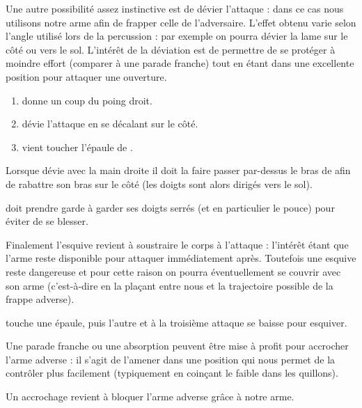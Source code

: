 Une autre possibilité assez instinctive est de dévier l'attaque : dans ce cas nous utilisons notre arme afin de frapper celle de l'adversaire.
L'effet obtenu varie selon l'angle utilisé lors de la percussion : par exemple on pourra dévier la lame sur le côté ou vers le sol.
L'intérêt de la déviation est de permettre de se protéger à moindre effort (comparer à une parade franche) tout en étant dans une excellente position pour attaquer une ouverture.


\begin{exercice}

\begin{enumerate}
	\item \A donne un coup du poing droit.
	
	\item \D dévie l'attaque en se décalant sur le côté.
	
	\item \D vient toucher l'épaule de \A.
\end{enumerate}

Lorsque \D dévie avec la main droite il doit la faire passer par-dessus le bras de \A afin de rabattre son bras sur le côté (les doigts sont alors dirigés vers le sol).

\D doit prendre garde à garder ses doigts serrés (et en particulier le pouce) pour éviter de se blesser.
\end{exercice}

Finalement l'esquive revient à soustraire le corps à l'attaque : l'intérêt étant que l'arme reste disponible pour attaquer immédiatement après.
Toutefois une esquive reste dangereuse et pour cette raison on pourra éventuellement se couvrir avec son arme (c'est-à-dire en la plaçant entre nous et la trajectoire possible de la frappe adverse).


\begin{exercice}
\A touche une épaule, puis l'autre et à la troisième attaque \D se baisse pour esquiver.
\end{exercice}


Une parade franche ou une absorption peuvent être mise à profit pour accrocher l'arme adverse : il s'agit de l'amener dans une position qui nous permet de la contrôler plus facilement (typiquement en coinçant le faible dans les quillons).


\begin{definition}[Accrochage]

Un accrochage revient à bloquer l'arme adverse grâce à notre arme.
\end{definition}


